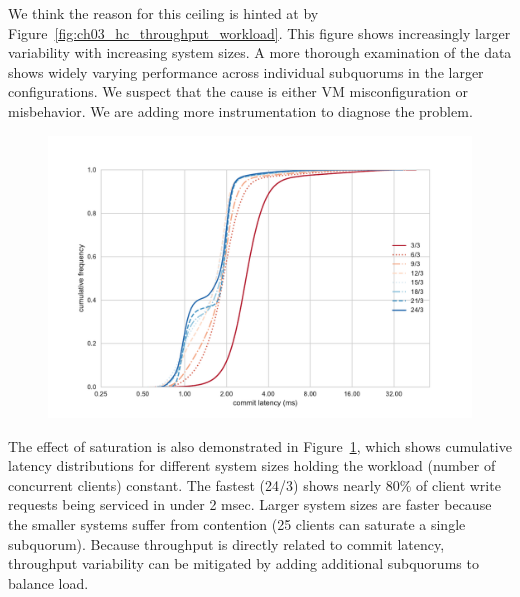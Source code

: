 We think the reason for this ceiling is hinted at by Figure~\ref{fig:ch03_hc_throughput_workload}.
This figure shows increasingly larger variability with increasing system sizes.
A more thorough examination of the data shows widely varying performance across individual subquorums in the larger configurations.
We suspect that the cause is either VM misconfiguration or misbehavior.
We are adding more instrumentation to diagnose the problem.

\begin{figure}
    \begin{center}
        \includegraphics[width=5in]{figures/ch03_ec2_latency_cumfreq.pdf}
    \end{center}
    \renewcommand{\baselinestretch}{1}
    \small\normalsize

    \begin{quote}
        \caption[HC Cumulative Latency Distribution]{}
        \label{fig:ch03_ec2_latency_cumfreq}
    \end{quote}
\end{figure}
\renewcommand{\baselinestretch}{2}
\small\normalsize

The effect of saturation is also demonstrated in Figure~\ref{fig:ch03_ec2_latency_cumfreq}, which shows cumulative latency distributions for different system sizes holding the  workload (number of concurrent clients) constant.
The fastest (24/3) shows nearly 80\% of client write requests being serviced in under 2 msec.
Larger system sizes are faster because the smaller systems suffer from contention (25 clients can saturate a single subquorum).
Because throughput is directly related to commit latency, throughput variability can be mitigated by adding additional subquorums to balance load.

